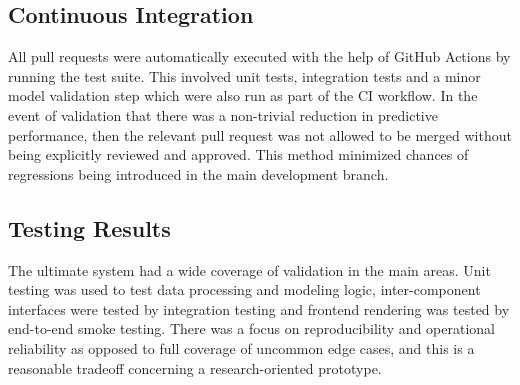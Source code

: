 \subsection{Continuous Integration}
All pull requests were automatically executed with the help of GitHub Actions by running the test suite. This involved unit tests, integration tests and a minor model validation step which were also run as part of the CI workflow. In the event of validation that there was a non-trivial reduction in predictive performance, then the relevant pull request was not allowed to be merged without being explicitly reviewed and approved. This method minimized chances of regressions being introduced in the main development branch.

\subsection{Testing Results}
The ultimate system had a wide coverage of validation in the main areas. Unit testing was used to test data processing and modeling logic, inter-component interfaces were tested by integration testing and frontend rendering was tested by end-to-end smoke testing. There was a focus on reproducibility and operational reliability as opposed to full coverage of uncommon edge cases, and this is a reasonable tradeoff concerning a research-oriented prototype.
